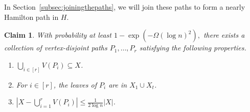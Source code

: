 \documentclass[10pt]{article}
\theoremstyle{plain}
\numberwithin{theorem}{section}
\newtheorem{claim}{Claim}[theorem]
\theoremstyle{definition}
\theoremstyle{remark}
\renewcommand{\setminus}{-}
\theoremstyle{plain}
\begin{document}
    
    In Section~\ref{subsec:joiningthepaths}, we will join these paths to form a nearly Hamilton path in $H$.

	\begin{claim}
		\label{claim:findingpaths}
		With probability at least $1 - \exp \left(-\Omega(\log n)^2\right),$ there exists a collection of vertex-disjoint paths $P_1, \ldots, P_r$ satisfying the following properties.
		\begin{enumerate}[label = \rm(P\arabic*)]
			\item \label{itm:findpaths-1} 
				$\bigcup_{i \in [r]}V(P_i) \subseteq X$.
			\item \label{itm:findpaths-2}
				For $i \in [r]$, the leaves of $P_i$ are in $X_1 \cup X_t$.
			\item \label{itm:findpaths-3}
				$|X \setminus \bigcup_{i = 1 }^r V(P_i)| \le \frac{1}{2\log n} |X|$.
		\end{enumerate}
	\end{claim}
\end{document}
